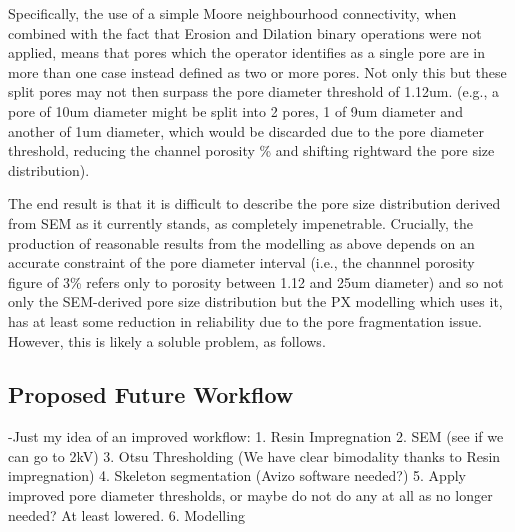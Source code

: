 \documentclass[3p,twocolumn]{elsarticle}
\begin{document}
  Specifically, the use of a simple Moore neighbourhood connectivity, when
  combined with the fact that Erosion and Dilation binary operations were not
  applied, means that pores which the operator identifies as a single pore are
  in more than one case instead defined as two or more pores. Not only this but
  these split pores may not then surpass the pore diameter threshold of 1.12um.
  (e.g., a pore of 10um diameter might be split into 2 pores, 1 of 9um diameter
  and another of 1um diameter, which would be discarded due to the pore diameter
  threshold, reducing the channel porosity \% and shifting rightward the pore
  size distribution).

  The end result is that it is difficult to describe the pore size distribution
  derived from SEM as it currently stands, as completely impenetrable.
  Crucially, the production of reasonable results from the modelling as above
  depends on an accurate constraint of the pore diameter interval (i.e., the
  channnel porosity figure of 3\% refers only to porosity between 1.12 and 25um
  diameter) and so not only the SEM-derived pore size distribution but the PX
  modelling which uses it, has at least some reduction in reliability due to the
  pore fragmentation issue. However, this is likely a soluble problem, as follows.

  \subsection{Proposed Future Workflow}

  -Just my idea of an improved workflow:
  1. Resin Impregnation
  2. SEM (see if we can go to 2kV)
  3. Otsu Thresholding (We have clear bimodality thanks to Resin impregnation)
  4. Skeleton segmentation (Avizo software needed?)
  5. Apply improved pore diameter thresholds, or maybe do not do any at all as no longer needed? At least lowered.
  6. Modelling


\clearpage


\end{document}
